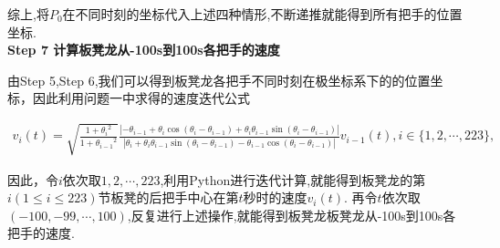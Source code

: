 \documentclass[../main.tex]{subfiles}
\begin{document}
\par 综上,将$P_0$在不同时刻的坐标代入上述四种情形,不断递推就能得到所有把手的位置坐标.
\\\noindent\textbf{Step 7 计算板凳龙从-100s到100s各把手的速度} 
\par 由Step 5,Step 6,我们可以得到板凳龙各把手不同时刻在极坐标系下的的位置坐标，因此利用问题一中求得的速度迭代公式
\begin{small}
\begin{align}
v_i(t) = \sqrt{\frac{1 + {\theta _i}^2}{1 + {\theta _{i - 1}}^2}}\frac{|-\theta _{i - 1}+\theta _i\cos(\theta _{i }-\theta _{i-1})+\theta _i\theta _{i - 1}\sin(\theta _{i }-\theta _{i-1})|}{|\theta _i+\theta _i\theta _{i - 1}\sin(\theta _i -\theta _{i-1})-\theta _{i - 1}\cos(\theta _i -\theta _{i-1})|} v_{i - 1}(t), i\in \{1, 2, \cdots, 223\},
\end{align}
\end{small}
\par  因此，令\(i\)依次取\(1, 2, \cdots, 223\),利用Python进行迭代计算,就能得到板凳龙的第\(i(1\leqslant i\leqslant 223)\)节板凳的后把手中心在第\(t\)秒时的速度\(v_i(t)\).
再令\(t\)依次取$(-100, -99, \cdots, 100)$,反复进行上述操作,就能得到板凳龙板凳龙从-100s到100s各把手的速度.  
\end{document}
